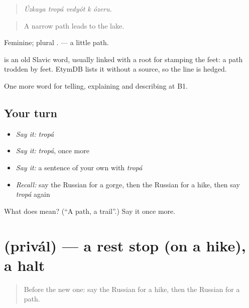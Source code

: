 \begin{quote}
\emph{Úzkaya tropá vedyót k ózeru.}
\end{quote}

\begin{quote}
A narrow path leads to the lake.
\end{quote}

Feminine; plural \emph{}. \emph{} — a little path.

\begin{cousinweb}
\emph{} is an old Slavic word, usually linked with a root for stamping the feet: a path trodden by feet. EtymDB lists it without a source, so the line is hedged.
\end{cousinweb}

\begin{grammarlens}[title={What you've built}]
One more word for telling, explaining and describing at B1.
\end{grammarlens}

\subsection*{Your turn}
\begin{itemize}
\raggedright
  \item \emph{Say it:} \emph{tropá}
  \item \emph{Say it:} \emph{tropá}, once more
  \item \emph{Say it:} a sentence of your own with \emph{tropá}
  \item \emph{Recall:} say the Russian for a gorge, then the Russian for a hike, then say \emph{tropá} again
\end{itemize}

\begin{tcolorbox}[breakable,colback=teal!4,colframe=teal!35!black,title={Before you move on}]
What does  mean? (\textquotedblleft{}A path, a trail\textquotedblright{}.) Say it once more.
\end{tcolorbox}
\section[\texorpdfstring{\ru{привал} (privál)}{привал (privál)}]{ (privál) — a rest stop (on a hike), a halt}

\label{lesson:RU-C459-prival}



\begin{quote}
Before the new one: say the Russian for a hike, then the Russian for a path.
\end{quote}


